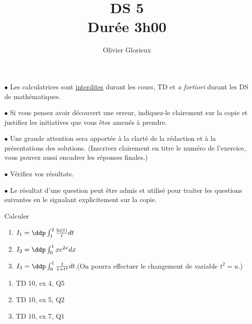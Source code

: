 \documentclass[a4paper, 11pt,reqno]{article}
\author{Olivier Glorieux}
\begin{document}
\title{DS 5\\
\Large{Durée 3h00}
}

\vspace{1cm}
\begin{center}

\begin{description}
\item$\bullet$ Les calculatrices sont \underline{interdites} durant les cours, TD et \emph{a fortiori} durant les DS de mathématiques. \\

\item $\bullet $ Si vous pensez avoir découvert une erreur, indiquez-le clairement sur la copie et justifiez les initiatives que vous êtes amenés à prendre. \\

\item $\bullet$ Une grande attention sera apportée à la clarté de la rédaction et à la présentations des solutions. (Inscrivez clairement en titre le numéro de l'exercice, vous pouvez aussi encadrer les réponses finales.)  \\

\item $\bullet$ Vérifiez vos résultats. \\

\item $\bullet$ Le résultat d'une question peut être admis et utilisé pour traiter les questions suivantes en le signalant explicitement sur la copie. 
\end{description}

\end{center} 

\newpage
\begin{exercice}
Calculer
\begin{enumerate}
\item  $I_1=\ddp\int_1^2 \frac{\ln(t)}{t}dt$
\item $I_2 =\ddp \int_0^1 xe^{2x}dx$
\item $I_3 =\ddp\int_0^1 \frac{t}{1+t^4}dt$.\quad   (On pourra effectuer le changement de variable $t^2=u$.)
\end{enumerate}
\end{exercice}

\begin{correction}
\begin{enumerate}
\item  TD 10, ex 4, Q5
\item  TD 10, ex 5, Q2
\item  TD 10, ex 7, Q1
\end{enumerate}
\end{correction}
\vspace{0.5cm}
\end{document}
